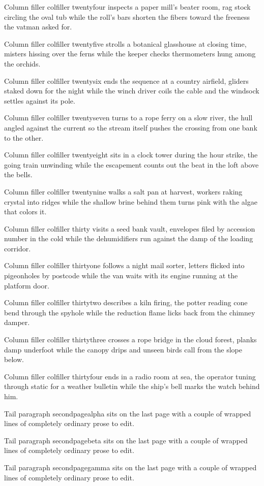 \documentclass[twocolumn]{article}
\begin{document}
Column filler colfiller twentyfour inspects a paper mill's beater room, rag
stock circling the oval tub while the roll's bars shorten the fibers toward
the freeness the vatman asked for.

Column filler colfiller twentyfive strolls a botanical glasshouse at closing
time, misters hissing over the ferns while the keeper checks thermometers
hung among the orchids.

Column filler colfiller twentysix ends the sequence at a country airfield,
gliders staked down for the night while the winch driver coils the cable and
the windsock settles against its pole.

Column filler colfiller twentyseven turns to a rope ferry on a slow river, the
hull angled against the current so the stream itself pushes the crossing from
one bank to the other.

Column filler colfiller twentyeight sits in a clock tower during the hour
strike, the going train unwinding while the escapement counts out the beat in
the loft above the bells.

Column filler colfiller twentynine walks a salt pan at harvest, workers raking
crystal into ridges while the shallow brine behind them turns pink with the
algae that colors it.

Column filler colfiller thirty visits a seed bank vault, envelopes filed by
accession number in the cold while the dehumidifiers run against the damp of
the loading corridor.

Column filler colfiller thirtyone follows a night mail sorter, letters flicked
into pigeonholes by postcode while the van waits with its engine running at
the platform door.

Column filler colfiller thirtytwo describes a kiln firing, the potter reading
cone bend through the spyhole while the reduction flame licks back from the
chimney damper.

Column filler colfiller thirtythree crosses a rope bridge in the cloud forest,
planks damp underfoot while the canopy drips and unseen birds call from the
slope below.

Column filler colfiller thirtyfour ends in a radio room at sea, the operator
tuning through static for a weather bulletin while the ship's bell marks the
watch behind him.

Tail paragraph secondpagealpha sits on the last page with a couple of
wrapped lines of completely ordinary prose to edit.

Tail paragraph secondpagebeta sits on the last page with a couple of
wrapped lines of completely ordinary prose to edit.

Tail paragraph secondpagegamma sits on the last page with a couple of
wrapped lines of completely ordinary prose to edit.
\end{document}

